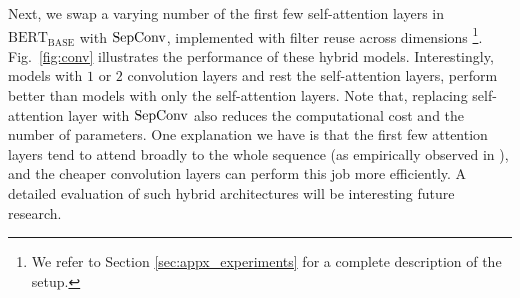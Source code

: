\documentclass{article} %
\newcommand{\BB}{\text{BERT}_{\text{BASE}}}
\begin{document}


Next, we swap a varying number of the first few self-attention layers in $\BB$ with ${\rm SepConv}$, implemented with filter reuse across dimensions \citep{wu2019pay}\footnote{We refer to Section \ref{sec:appx_experiments} for a complete description of the setup.}. Fig.~\ref{fig:conv} illustrates the performance of these hybrid models.  Interestingly, models with $1$ or $2$ convolution layers and rest the self-attention layers, perform better than models with only the self-attention layers.
Note that, replacing self-attention layer with ${\rm SepConv}$ also reduces the computational cost and the number of parameters. 
One explanation we have is that the first few attention layers tend to attend broadly to the whole sequence (as empirically observed in \citep{clark2019does}), and the cheaper convolution layers can perform this job more efficiently. A detailed evaluation of such hybrid architectures will be interesting future research.
\end{document}
